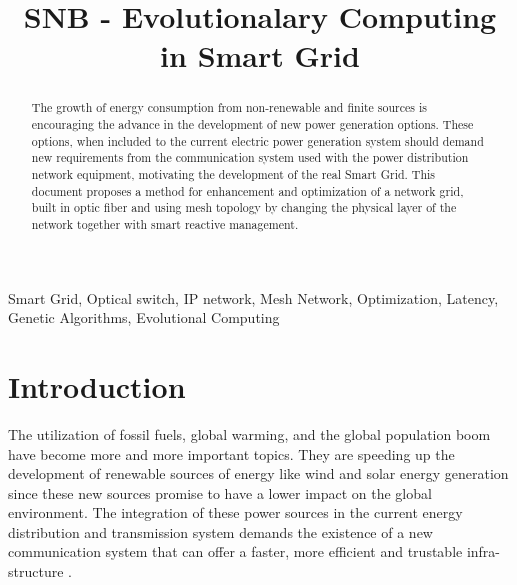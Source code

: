 \documentclass[conference]{IEEEtran}
\begin{document}
\title{SNB - Evolutionalary Computing in Smart Grid
}

\author{
\and
{}
\and
{}
}

\maketitle

\begin{abstract}
The growth  of energy consumption from non-renewable and finite sources is encouraging the advance in the development of new power generation options. These options, when included to the current electric power generation system should demand new requirements from the communication system used with the power distribution network equipment, motivating the development of the real Smart Grid. This document proposes a method for enhancement and optimization of a network grid, built in optic fiber and using mesh topology by changing the physical layer of the network together with smart reactive management.
\end{abstract}

\begin{IEEEkeywords}
Smart Grid, Optical switch, IP network, Mesh Network, Optimization, Latency, Genetic Algorithms, Evolutional Computing
\end{IEEEkeywords}

\section{Introduction}
The utilization of fossil fuels, global warming, and the global population boom have become more and more important topics. They are speeding up the development of renewable sources of energy like wind and solar energy generation since these new sources promise to have a lower impact on the global environment. The integration of these power sources in the current energy distribution and transmission system demands the existence of a new communication system that can offer a faster, more efficient and trustable infra-structure \cite{Art-Gungor2013}.
\end{document}
